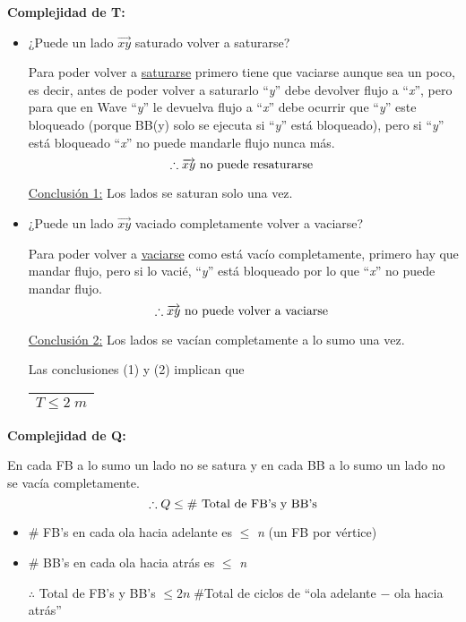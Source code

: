 \documentclass[12pt,a4paper]{report}
\begin{document}
			\vspace{5mm}
			\textbf{Complejidad de T:}
			\begin{itemize}
				\item ¿Puede un lado $\overrightarrow{xy}$ saturado volver a saturarse?
					\par Para poder volver a \underline{saturarse} primero tiene que vaciarse aunque sea un poco, es decir, antes de poder volver a saturarlo \textquotedblleft \textit{y}\textquotedblright \; debe devolver flujo a \textquotedblleft \textit{x}\textquotedblright \;, pero para que en Wave \textquotedblleft \textit{y}\textquotedblright \; le devuelva flujo a \textquotedblleft \textit{x}\textquotedblright \;  debe ocurrir que \textquotedblleft \textit{y}\textquotedblright \; este bloqueado (porque BB(y) solo se ejecuta si \textquotedblleft \textit{y}\textquotedblright \; está bloqueado), pero si \textquotedblleft \textit{y}\textquotedblright \; está bloqueado \textquotedblleft \textit{x}\textquotedblright \; no puede mandarle flujo nunca más.
					\[ \therefore \overrightarrow{xy} \textup{ no puede resaturarse } \]
					\par \underline{Conclusión 1:} Los lados se saturan solo una vez.
				\item ¿Puede un lado $\overrightarrow{xy}$ vaciado completamente volver a vaciarse?
					\par Para poder volver a \underline{vaciarse} como está vacío completamente, primero hay que mandar flujo, pero si lo vacié, \textquotedblleft \textit{y}\textquotedblright \; está bloqueado por lo que \textquotedblleft \textit{x}\textquotedblright \; no puede mandar flujo.
					\[ \therefore \overrightarrow{xy} \textup{ no puede volver a vaciarse } \]
					\par \underline{Conclusión 2:} Los lados se vacían completamente a lo sumo una vez.

				\par Las conclusiones (1) y (2) implican que \begin{tabular}{|c|} \hline $T \leq 2 \; m$ \\\hline \end{tabular}
			\end{itemize}

			\textbf{Complejidad de Q:}
				\par En cada FB a lo sumo un lado no se satura y en cada BB a lo sumo un lado no se vacía completamente.
				\[ \therefore Q \leq \# \textup{ Total de FB's y BB's} \]
				\begin{itemize}
					\item \# FB's en cada ola hacia adelante es $\leq$ \textit{n} (un FB por vértice)
					\item \# BB's en cada ola hacia atrás es $\leq$ \textit{n}

					\vspace{5mm}
					\par $\therefore$ Total de FB's y BB's $\leq 2 n \; \#$Total de ciclos de \textquotedblleft ola adelante $-$ ola hacia atrás\textquotedblright
	 			\end{itemize}
\end{document}
